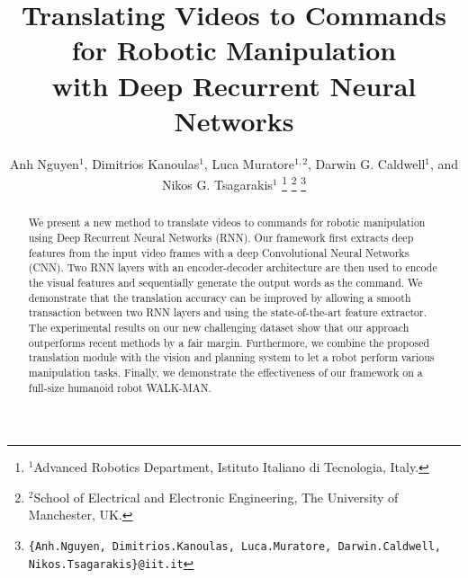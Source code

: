 \documentclass[letterpaper, 10 pt, conference]{class/ieeeconf}  %
\title{\LARGE \bf Translating Videos to Commands for Robotic Manipulation\\ with Deep Recurrent Neural Networks}
\author{Anh Nguyen$^1$, Dimitrios Kanoulas$^1$, Luca Muratore$^{1,2}$, Darwin G. Caldwell$^1$, and Nikos G. Tsagarakis$^1$
\thanks{$^1$Advanced Robotics Department, Istituto Italiano di Tecnologia, Italy.} 
\thanks{$^2$School of Electrical and Electronic Engineering, The University of Manchester, UK.}
\thanks{{\tt \{Anh.Nguyen, Dimitrios.Kanoulas, Luca.Muratore, Darwin.Caldwell, Nikos.Tsagarakis\}@iit.it}}}
\begin{document}


\maketitle
\thispagestyle{empty}
\pagestyle{empty}

\begin{abstract}
We present a new method to translate videos to commands for robotic manipulation using Deep Recurrent Neural Networks (RNN). Our framework first extracts deep features from the input video frames with a deep Convolutional Neural Networks (CNN). Two RNN layers with an encoder-decoder architecture are then used to encode the visual features and sequentially generate the output words as the command. We demonstrate that the translation accuracy can be improved by allowing a smooth transaction between two RNN layers and using the state-of-the-art feature extractor. The experimental results on our new challenging dataset show that our approach outperforms recent methods by a fair margin. Furthermore, we combine the proposed translation module with the vision and planning system to let a robot perform various manipulation tasks. Finally, we demonstrate the effectiveness of our framework on a full-size humanoid robot WALK-MAN.


\end{abstract}


 


%




   
\end{document}
